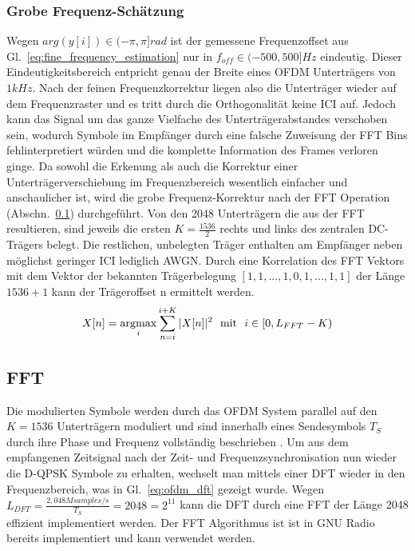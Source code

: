 \subsubsection{Grobe Frequenz-Schätzung}
Wegen $arg(y[i]) \in (-\pi,\pi] rad$ ist der gemessene Frequenzoffset aus Gl.~\ref{eq:fine_frequency_estimation} nur in $f_{off} \in (-500,500] Hz$ eindeutig. Dieser Eindeutigkeitsbereich entpricht genau der Breite eines OFDM Unterträgers von $1 kHz$. Nach der feinen Frequenzkorrektur liegen also die Unterträger wieder auf dem Frequenzraster und es tritt durch die Orthogonalität keine ICI auf. Jedoch kann das Signal um das ganze Vielfache des Unterträgerabstandes verschoben sein, wodurch Symbole im Empfänger durch eine falsche Zuweisung der FFT Bins fehlinterpretiert würden und die komplette Information des Frames verloren ginge.
Da sowohl die Erkenung als auch die Korrektur einer Unterträgerverschiebung im Frequenzbereich wesentlich einfacher und anschaulicher ist, wird die grobe Frequenz-Korrektur nach der FFT Operation (Abschn.~\ref{sec:FFT}) durchgeführt.
Von den 2048 Unterträgern die aus der FFT resultieren, sind jeweils die ersten $K = \frac{1536}{2}$ rechts und links des zentralen DC-Trägers belegt. Die restlichen, unbelegten Träger enthalten am Empfänger neben möglichst geringer \ac{ICI} lediglich \ac{AWGN}. Durch eine Korrelation des FFT Vektors mit dem Vektor der bekannten Trägerbelegung $[1,1,...,1,0,1,...,1,1]$ der Länge $1536+1$ kann der Trägeroffset n ermittelt werden.
\begin{equation}
X[n] = \operatorname*{\arg\!\max}_i \sum \limits_{n=i}^{i+K} |X[n]|^2 \ \ \text{mit} \ \ i \in [0,L_{FFT}-K)
\end{equation}

\subsection{FFT}
\label{sec:FFT}
Die modulierten Symbole werden durch das OFDM System parallel auf den $K=1536$ Unterträgern moduliert und sind innerhalb eines Sendesymbols $T_S$ durch ihre Phase und Frequenz vollständig beschrieben \cite{nt1}. Um aus dem empfangenen Zeitsignal nach der Zeit- und Frequenzsynchronisation nun wieder die D-QPSK Symbole zu erhalten, wechselt man mittels einer \ac{DFT} wieder in den Frequenzbereich, was in Gl.~\ref{eq:ofdm_dft} gezeigt wurde. Wegen $L_{DFT} = \frac{2,048 M samples/s}{T_S} = 2048 = 2^{11}$ kann die \ac{DFT} durch eine \ac{FFT} der Länge 2048 effizient implementiert werden. Der \ac{FFT} Algorithmus ist ist in GNU Radio \cite{repo:gr-fft} bereits implementiert und kann verwendet werden.

